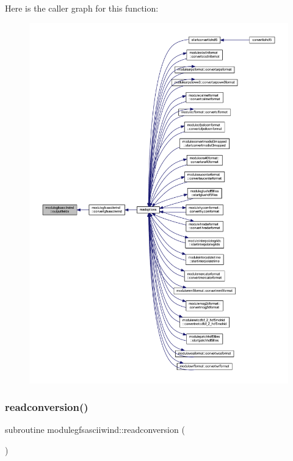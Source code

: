 Here is the caller graph for this function\+:\nopagebreak
\begin{figure}[H]
\begin{center}
\leavevmode
\includegraphics[width=350pt]{namespacemodulegfsasciiwind_ab51247b85cb09b0446fe50076953724a_icgraph}
\end{center}
\end{figure}
\mbox{\label{namespacemodulegfsasciiwind_a2ae7830d5f79fbdaea50e4f86eef0d4b}} 
\subsubsection{\texorpdfstring{readconversion()}{readconversion()}}
{\footnotesize\ttfamily subroutine modulegfsasciiwind\+::readconversion (\begin{DoxyParamCaption}{ }\end{DoxyParamCaption})\hspace{0.3cm}{\ttfamily [private]}}

